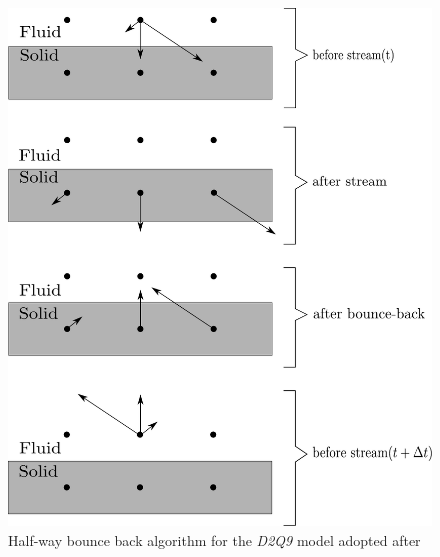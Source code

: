 \begin{figure}[htbp]
\centering
\includegraphics[scale=0.5]{Chapter3/figures/lbm/bounce.pdf}
\caption[Half-way bounce back algorithm for the \textit{D2Q9} model ]{Half-way bounce back algorithm for the \textit{D2Q9} model adopted after \citet{Sukop2006}}
\label{fig:bounce}
\end{figure}


